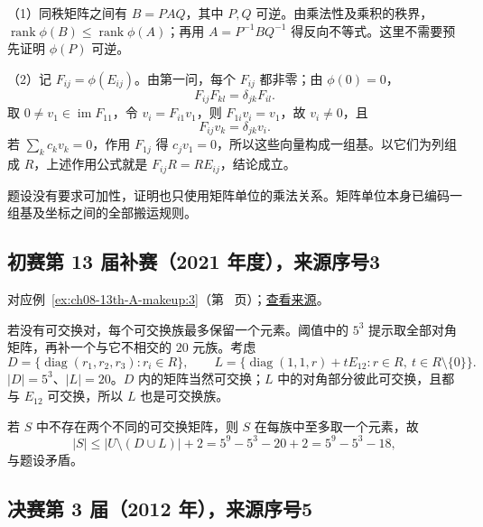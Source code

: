 \documentclass[UTF8,12pt,a4paper,fontset=fandol]{ctexart}
\begin{document}
\begin{solve}

（1）同秩矩阵之间有 $B=PAQ$，其中 $P,Q$ 可逆。由乘法性及乘积的秩界，$\operatorname{rank}\phi(B)\le\operatorname{rank}\phi(A)$；再用 $A=P^{-1}BQ^{-1}$ 得反向不等式。这里不需要预先证明 $\phi(P)$ 可逆。

（2）记 $F_{ij}=\phi(E_{ij})$。由第一问，每个 $F_{ij}$ 都非零；由 $\phi(0)=0$，
\[
F_{ij}F_{kl}=\delta_{jk}F_{il}.
\]
取 $0\ne v_1\in\operatorname{im}F_{11}$，令 $v_i=F_{i1}v_1$，则 $F_{1i}v_i=v_1$，故 $v_i\ne0$，且
\[
F_{ij}v_k=\delta_{jk}v_i.
\]
若 $\sum_kc_kv_k=0$，作用 $F_{1j}$ 得 $c_jv_1=0$，所以这些向量构成一组基。以它们为列组成 $R$，上述作用公式就是 $F_{ij}R=RE_{ij}$，结论成立。

\end{solve}

\begin{remark}[方法与条件]

题设没有要求可加性，证明也只使用矩阵单位的乘法关系。矩阵单位本身已编码一组基及坐标之间的全部搬运规则。

\end{remark}

\subsection{初赛第 13 届补赛（2021 年度），来源序号3}\label{ans:ch08-13th-A-makeup:3}\label{pr:ch08-13th-A-makeup:3}

对应例~\ref{ex:ch08-13th-A-makeup:3}（第~\pageref{ex:ch08-13th-A-makeup:3} 页）；\href{https://github.com/lzxcr/cmc-mathematics/blob/64916fa1fdbc3e444a652eca204d5669058ee321/src/problems/preliminary/13-makeup/03.md}{查看来源}。

\begin{solve}

若没有可交换对，每个可交换族最多保留一个元素。阈值中的 $5^3$ 提示取全部对角矩阵，再补一个与它不相交的 $20$ 元族。考虑
\[
D=\{\operatorname{diag}(r_1,r_2,r_3):r_i\in R\},
\qquad
L=\{\operatorname{diag}(1,1,r)+tE_{12}:
 r\in R,\ t\in R\setminus\{0\}\}.
\]
$|D|=5^3$、$|L|=20$。$D$ 内的矩阵当然可交换；$L$ 中的对角部分彼此可交换，且都与 $E_{12}$ 可交换，所以 $L$ 也是可交换族。

若 $S$ 中不存在两个不同的可交换矩阵，则 $S$ 在每族中至多取一个元素，故
\[
|S|\leq |U\setminus(D\cup L)|+2
=5^9-5^3-20+2=5^9-5^3-18,
\]
与题设矛盾。

\end{solve}

\subsection{决赛第 3 届（2012 年），来源序号5}\label{ans:fin03-all:5}\label{pr:fin03-all:5}
\end{document}
